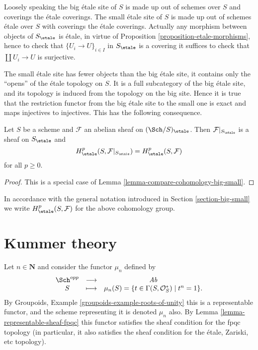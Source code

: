 \noindent
Loosely speaking the big \'etale site of $S$ is made up out of schemes over $S$
and coverings the \'etale coverings. The small \'etale site of $S$ is made up
out of schemes \'etale over $S$ with coverings the \'etale coverings.
Actually any morphism between objects of $S_\etale$ is \'etale, in
virtue of
Proposition \ref{proposition-etale-morphisms},
hence to check that $\{U_i \to U\}_{i \in I}$ in $S_\etale$
is a covering it suffices to check that $\coprod U_i \to U$ is surjective.

\medskip\noindent
The small \'etale site has fewer objects than the big \'etale site, it
contains only the ``opens'' of the \'etale topology on $S$. It is a full
subcategory of the big \'etale site, and its topology is induced from the
topology on the big site. Hence it is true that the restriction functor
from the big \'etale site to the small one is exact and maps injectives to
injectives. This has the following consequence.

\begin{proposition}
\label{proposition-cohomology-restrict-small-site}
Let $S$ be a scheme and $\mathcal{F}$ an abelian sheaf on
$(\Sch/S)_\etale$.
Then $\mathcal{F}|_{S_\etale}$ is a sheaf on $S_\etale$ and
$$
H^p_\etale(S, \mathcal{F}|_{S_\etale}) =
H^p_\etale(S, \mathcal{F})
$$
for all $p \geq 0$.
\end{proposition}

\begin{proof}
This is a special case of Lemma \ref{lemma-compare-cohomology-big-small}.
\end{proof}

\noindent
In accordance with the general notation introduced in
Section \ref{section-big-small}
we write $H_\etale^p(S, \mathcal{F})$ for the above cohomology group.





\section{Kummer theory}
\label{section-kummer}

\noindent
Let $n \in \mathbf{N}$ and consider the functor $\mu_n$ defined by
$$
\begin{matrix}
\Sch^{opp} & \longrightarrow & \textit{Ab} \\
S & \longmapsto &
\mu_n(S)
=
\{t \in \Gamma(S, \mathcal{O}_S^*) \mid t^n = 1 \}.
\end{matrix}
$$
By
Groupoids, Example \ref{groupoids-example-roots-of-unity}
this is a representable functor, and the scheme representing it
is denoted $\mu_n$ also. By
Lemma \ref{lemma-representable-sheaf-fpqc}
this functor satisfies the sheaf condition for the fpqc topology
(in particular, it also satisfies the sheaf condition for the
\'etale, Zariski, etc topology).

